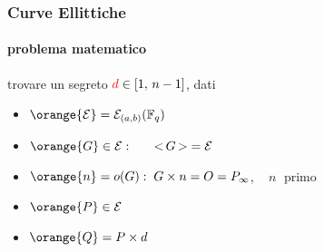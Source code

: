 \begin{frame}
	\frametitle{Curve Ellittiche}
	\framesubtitle{problema matematico}
	
	
	trovare un segreto ${\color{red}d}\in[1,\,n-1]$, dati
	\begin{itemize}
	  \item $\orange{\mathcal{E}}=\mathcal{E}_{(a,b)}(\mathbb{F}_q)$
	  \item $\orange{G}\in \mathcal{E}:\;\;\;\;\;\;\tiny{<}\,G\,\tiny{>}=\mathcal{E}$
	  \item $\orange{n}=o(G):\;G\times n= O=P_\infty$, $\;\;	\;n\;$ primo
	  \item $\orange{P}\in \mathcal{E}$
	  \item $\orange{Q}=P\times d$
	\end{itemize}
\end{frame}